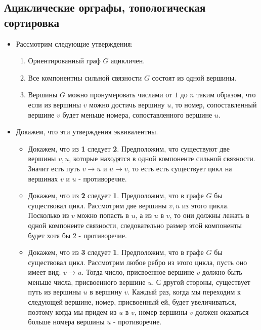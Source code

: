 \subsection{Ациклические орграфы, топологическая сортировка}
\begin{itemize}
    \item
    Рассмотрим следующие утверждения:
    \begin{enumerate}
        \item Ориентированный граф $G$ ацикличен.
        \item Все компонентны сильной связности $G$ состоят из одной вершины.
        \item Вершины $G$ можно пронумеровать числами от $1$ до $n$ таким образом, что если из вершины $v$ можно достичь вершину $u$, то номер, сопоставленный вершине $v$ будет меньше номера, сопоставленного вершине $u$.
    \end{enumerate}

    \item
    Докажем, что эти утверждения эквивалентны.
    \begin{itemize}
    \item Докажем, что из \textbf{1} следует \textbf{2}. Предположим, что существуют две вершины $v, u$, которые находятся в одной компоненте сильной связности. Значит есть путь $v \to u$ и $u \to v$, то есть есть существует цикл на вершинах $v$ и $u$ - противоречие.

    \item Докажем, что из \textbf{2} следует \textbf{1}. Предположим, что в графе $G$ бы существовал цикл. Рассмотрим две вершины $v, u$ из этого цикла. Посколько из $v$ можно попасть в $u$, а из $u$ в $v$, то они должны лежать в одной компоненте связности, следовательно размер этой компоненты будет хотя бы 2 - противоречие.

    \item Докажем, что из \textbf{3} следует \textbf{1}. Предположим, что в графе $G$ бы существовал цикл. Рассмотрим любое ребро из этого цикла, пусть оно имеет вид: $v \to u$. Тогда число, присвоенное вершине $v$ должно быть меньше числа, присвоенного вершине $u$. С другой стороны, существует путь из вершины $u$ в вершину $v$. Каждый раз, когда мы переходим к следующей вершине, номер, присвоенный ей, будет увеличиваться, поэтому когда мы придем из $u$ в $v$, номер вершины $v$ должен оказаться больше номера вершины $u$ - противоречие.


\end{itemize}
\end{itemize}

